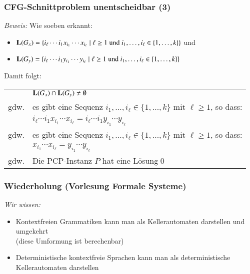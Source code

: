 \documentclass[onlymath]{beamer}
\begin{document}
\begin{frame}[t]\frametitle{CFG-Schnittproblem unentscheidbar (3)}

\emph{Beweis:} Wie soeben erkannt:
\begin{itemize}
\item $\textbf{\textcolor{black}{L}}(G_x)=\{ i_\ell\cdots i_1 x_{i_1}\cdots x_{i_\ell}\mid \ell\geq 1\text{ und } i_1,\ldots,i_\ell\in\{1,\ldots,k\}\}$ und
\item $\textbf{\textcolor{black}{L}}(G_y)=\{ i_\ell\cdots i_1 y_{i_1}\cdots y_{i_\ell}\mid \ell\geq 1\text{ und } i_1,\ldots,i_\ell\in\{1,\ldots,k\}\}$
\end{itemize}\bigskip\pause

Damit folgt:\medskip

\begin{tabular}{rl}
& $\textbf{\textcolor{black}{L}}(G_x)\cap\textbf{\textcolor{black}{L}}(G_y)\neq\emptyset$\\\pause
gdw. & es gibt eine Sequenz $i_1,\ldots,i_\ell\in\{1,\ldots,k\}$ mit $\ell\geq 1$, so dass:\\
	& $ i_\ell\cdots i_1 x_{i_1}\cdots x_{i_\ell} = i_\ell\cdots i_1 y_{i_1}\cdots y_{i_\ell}$\\\pause
gdw. & es gibt eine Sequenz $i_1,\ldots,i_\ell\in\{1,\ldots,k\}$ mit $\ell\geq 1$, so dass:\\
	& $ x_{i_1}\cdots x_{i_\ell} = y_{i_1}\cdots y_{i_\ell}$\\\pause
gdw. &  Die PCP-Instanz $P$ hat eine Lösung\qed\\
\end{tabular}

\end{frame}


\begin{frame}\frametitle{Wiederholung (Vorlesung Formale Systeme)}

\emph{Wir wissen:}
\begin{itemize}
\item Kontextfreien Grammatiken kann man als Kellerautomaten darstellen und umgekehrt\\
 (diese Umformung ist berechenbar)
\item Deterministische kontextfreie Sprachen kann man als deterministische Kellerautomaten darstellen
\end{itemize}
\bigskip


\end{frame}
\end{document}
